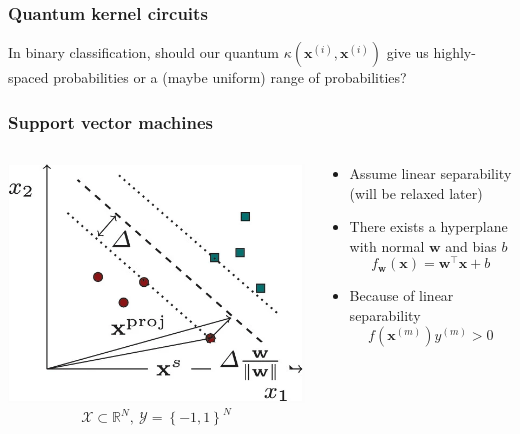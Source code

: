 \documentclass[aspectratio=43]{beamer}
\newcommand{\R}{\mathbb{R}}  %
\newcommand{\kernel}[2]{\kappa\left( #1, #2 \right)}
\begin{document}
\begin{frame}
  \frametitle{Quantum kernel circuits}

  \centering
  \color{red} In binary classification, should our quantum $\kernel{\mathbf{x}^{(i)}}{\mathbf{x}^{(i)}}$ give us highly-spaced probabilities or a (maybe uniform) range of probabilities?

\end{frame}


\begin{frame}
  \frametitle{Support vector machines}

  \begin{columns}[onlytextwidth]
    \begin{column}{.5\textwidth}
      \centering
      \includegraphics[width=\textwidth]{pics/supp-vecs.png}
      \[\mathcal{X} \subset \R^N,\: \mathcal{Y} = \left\{ -1,1 \right\}^N\]
    \end{column}
    \begin{column}{.5\textwidth}
      \small
      \begin{itemize}
        \item Assume linear separability (will be relaxed later)
        \item There exists a hyperplane with normal $\mathbf{w}$ and bias $b$
        \[f_\mathbf{w}(\mathbf{x}) = \mathbf{w}^\top \mathbf{x} + b\]
        \item Because of linear separability
      \[f\left( \mathbf{x}^{(m)} \right)y^{(m)} > 0\] 
      \end{itemize}
    \end{column}
  \end{columns}

\end{frame}
\end{document}
